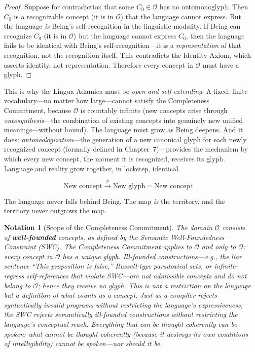 \documentclass[12pt, letterpaper]{book}
\def\equiv{=}%
\newtheorem*{notation}{Notation}
\begin{document}
\begin{proof}
Suppose for contradiction that some $C_0 \in \mathcal{O}$ has no ontomonoglyph. Then $C_0$ is a recognizable concept (it is in $\mathcal{O}$) that the language cannot express. But the language \textit{is} Being's self-recognition in the linguistic modality. If Being can recognize $C_0$ (it is in $\mathcal{O}$) but the language cannot express $C_0$, then the language fails to be identical with Being's self-recognition---it is a \textit{representation} of that recognition, not the recognition itself. This contradicts the Identity Axiom, which asserts identity, not representation. Therefore every concept in $\mathcal{O}$ must have a glyph.
\end{proof}

This is why the Lingua Adamica must be \textit{open and self-extending}. A fixed, finite vocabulary---no matter how large---cannot satisfy the Completeness Commitment, because $\mathcal{O}$ is countably infinite (new concepts arise through \textit{ontosynthesis}---the combination of existing concepts into genuinely new unified meanings---without bound). The language must grow as Being deepens. And it does: \textit{ontoneologization}---the generation of a new canonical glyph for each newly recognized concept (formally defined in Chapter~7)---provides the mechanism by which every new concept, the moment it is recognized, receives its glyph. Language and reality grow together, in lockstep, identical.

\[
\text{New concept} \xrightarrow{\nu} \text{New glyph} \equiv \text{New concept}
\]

The language never falls behind Being. The map \textit{is} the territory, and the territory never outgrows the map.

\begin{notation}[Scope of the Completeness Commitment]
The domain $\mathcal{O}$ consists of \textbf{well-founded} concepts, as defined by the Semantic Well-Foundedness Constraint (SWC). The Completeness Commitment applies to $\mathcal{O}$ and only to $\mathcal{O}$: every concept in $\mathcal{O}$ has a unique glyph. Ill-founded constructions---e.g., the liar sentence ``This proposition is false,'' Russell-type paradoxical sets, or infinite-regress self-references that violate SWC---are not admissible concepts and do not belong to $\mathcal{O}$; hence they receive no glyph. This is not a restriction on the language but a \textit{definition of what counts as a concept}. Just as a compiler rejects syntactically invalid programs without restricting the language's expressiveness, the SWC rejects semantically ill-founded constructions without restricting the language's conceptual reach. Everything that can be thought coherently can be spoken; what cannot be thought coherently (because it destroys its own conditions of intelligibility) cannot be spoken---nor should it be.
\end{notation}
\end{document}
